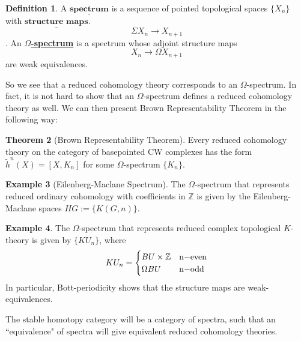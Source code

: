 \documentclass{article}
\theoremstyle{definition}
\newtheorem{theorem}{Theorem}[section] %
\newtheorem{definition}[theorem]{Definition}
\newtheorem{example}[theorem]{Example}
\begin{document}
\begin{tcolorbox}[colback=purple!5!white,colframe=purple!75!black]
\begin{definition}
A $\underline{\textbf{spectrum}}$ is a sequence of pointed topological spaces $\{X_n\}$ with $\underline{\textbf{structure maps}}$.
\[\Sigma X_n\to X_{n+1}\]
. An \underline{\textbf{$\Omega$-spectrum}} is a spectrum whose adjoint structure maps
\[X_n\to \Omega X_{n+1}\]
are weak equivalences. 
\end{definition}
\end{tcolorbox}
So we see that a reduced cohomology theory corresponds to an $\Omega$-spectrum. In fact, it is not hard to show that an $\Omega$-spectrum defines a reduced cohomology theory as well. We can then present Brown Representability Theorem in the following way:
\begin{tcolorbox}[colback=red!5!white,colframe=red!30!white]
\begin{theorem}[Brown Representability Theorem]
    Every reduced cohomology theory on the category of basepointed CW complexes  has the form $\tilde{h}^n(X) = [X,K_n]$ for some $\Omega$-spectrum $\{K_n\}$.
\end{theorem}
\end{tcolorbox}

\begin{tcolorbox}[colback=yellow!5!white,colframe=yellow!30!white]
\begin{example}[Eilenberg-Maclane Spectrum]
The $\Omega$-spectrum that represents reduced ordinary cohomology with coefficients in $\mathbb{Z}$ is given by the Eilenberg-Maclane spaces $HG:=\{K(G,n)\}$.
\end{example}
\end{tcolorbox}

\begin{tcolorbox}[colback=yellow!5!white,colframe=yellow!30!white]
\begin{example}
    The $\Omega$-spectrum that represents reduced complex topological $K$-theory is given by $\{KU_n\}$, where 
    \[  KU_n=
    \begin{cases}
        BU\times \mathbb{Z}& $n$-\textrm{even}\\
        \Omega BU & $n$-\textrm{odd}
    \end{cases}\]
  In particular, Bott-periodicity shows that the structure maps are weak-equivalences.
\end{example}
\end{tcolorbox}

The stable homotopy category will be a category of spectra, such that an ``equivalence" of spectra will give equivalent reduced cohomology theories.
\end{document}
